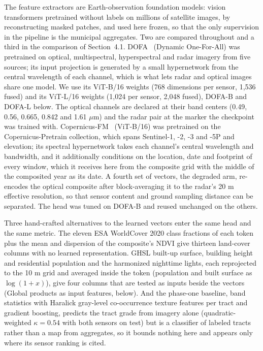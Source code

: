 \documentclass[11pt]{article}
\begin{document}
The feature extractors are Earth-observation foundation models: vision transformers
pretrained without labels on millions of satellite images, by reconstructing masked
patches, and used here frozen, so that the only supervision in the pipeline is the
municipal aggregates. Two are compared throughout and a third in the comparison of
Section~4.1. DOFA~\cite{xiong2024} (Dynamic One-For-All) was pretrained on optical,
multispectral, hyperspectral and radar imagery from five sources; its input projection
is generated by a small hypernetwork from the central wavelength of each channel, which
is what lets radar and optical images share one model. We use its ViT-B/16 weights (768
dimensions per sensor, 1{,}536 fused) and its ViT-L/16 weights (1{,}024 per sensor,
2{,}048 fused), DOFA-B and DOFA-L below. The optical channels are declared at their band
centers (0.49, 0.56, 0.665, 0.842 and 1.61 $\mu$m) and the radar pair at the marker the
checkpoint was trained with. Copernicus-FM~\cite{wang2025cfm} (ViT-B/16) was pretrained
on the Copernicus-Pretrain collection, which spans Sentinel-1, -2, -3 and -5P and
elevation; its spectral hypernetwork takes each channel's central wavelength and
bandwidth, and it additionally conditions on the location, date and footprint of every
window, which it receives here from the composite grid with the middle of the composited
year as its date. A fourth set of
vectors, the degraded arm, re-encodes the optical composite after block-averaging it to
the radar's 20 m effective resolution, so that sensor content and ground sampling
distance can be separated. The head was tuned on DOFA-B and reused unchanged
on the others.

Three hand-crafted alternatives to the learned vectors enter the same head and the same
metric. The eleven ESA WorldCover 2020 class fractions of each token plus the mean and
dispersion of the composite's NDVI give thirteen land-cover columns with no learned
representation. GHSL built-up surface, building height and residential population and
the harmonized nighttime lights, each reprojected to the 10 m grid and averaged inside
the token (population and built surface as $\log(1 + x)$), give four columns that are
tested as inputs beside the vectors (Global products as input features, below). And the
phase-one baseline, band statistics with Haralick gray-level co-occurrence texture
features per tract and gradient boosting, predicts the tract grade from imagery alone
(quadratic-weighted $\kappa = 0.54$ with both sensors on test) but is a classifier of
labeled tracts rather than a map from aggregates, so it bounds nothing here and appears
only where its sensor ranking is cited.
\end{document}

